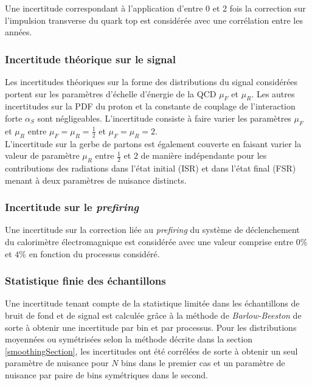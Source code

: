 Une incertitude correspondant à l'application d'entre 0 et 2 fois la correction sur l'impulsion transverse du quark top est considérée avec une corrélation entre les années. 

\subsubsection{ Incertitude théorique sur le signal}

Les incertitudes théoriques sur la forme des distributions du signal considérées portent sur les paramètres d'échelle d'énergie de la QCD $\mu_F$ et $\mu_R$. Les autres incertitudes sur la PDF du proton et la constante de couplage de l'interaction forte $\alpha_S$ sont négligeables. L'incertitude consiste à faire varier les paramètres $\mu_F$ et $\mu_R$ entre $\mu_F=\mu_R=\frac{1}{2}$ et $\mu_F=\mu_R=2$. \\

L'incertitude sur la gerbe de partons est également couverte en faisant varier la valeur de paramètre $\mu_R$ entre $\frac{1}{2}$ et $2$ de manière indépendante pour les contributions des radiations dans l'état initial (ISR) et dans l'état final (FSR) menant à deux paramètres de nuisance distincts.

\subsubsection{ Incertitude sur le \textit{prefiring}}

Une incertitude sur la correction liée au \textit{prefiring} du système de déclenchement du calorimètre électromagnique est considérée avec une valeur comprise entre $0\%$ et $4\%$ en fonction du processus considéré.

\subsubsection{ Statistique finie des échantillons}

Une incertitude tenant compte de la statistique limitée dans les échantillons de bruit de fond et de signal est calculée grâce à la méthode de \textit{Barlow-Beeston} \cite{BARLOW1993219,Conway:1333496} de sorte à obtenir une incertitude par bin et par processus. Pour les distributions moyennées ou symétrisées selon la méthode décrite dans la section \ref{smoothingSection}, les incertitudes ont été corrélées de sorte à obtenir un seul paramètre de nuisance pour $N$ bins dans le premier cas et un paramètre de nuisance par paire de bins symétriques dans le second.


